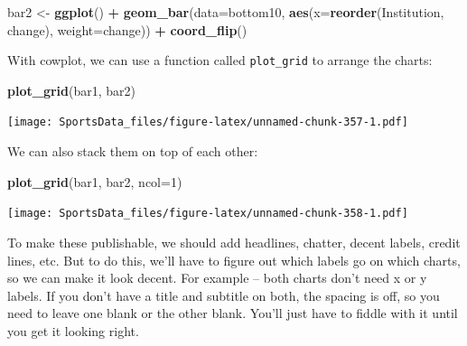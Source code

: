 \documentclass[
]{book}
\newenvironment{Shaded}{\begin{snugshade}}{\end{snugshade}}
\newcommand{\DataTypeTok}[1]{\textcolor[rgb]{0.13,0.29,0.53}{#1}}
\newcommand{\DecValTok}[1]{\textcolor[rgb]{0.00,0.00,0.81}{#1}}
\newcommand{\KeywordTok}[1]{\textcolor[rgb]{0.13,0.29,0.53}{\textbf{#1}}}
\newcommand{\NormalTok}[1]{#1}
\newcommand{\OperatorTok}[1]{\textcolor[rgb]{0.81,0.36,0.00}{\textbf{#1}}}
\newcommand{\StringTok}[1]{\textcolor[rgb]{0.31,0.60,0.02}{#1}}
\begin{document}
\begin{Shaded}
\begin{Highlighting}[]
\NormalTok{bar2 <-}\StringTok{ }\KeywordTok{ggplot}\NormalTok{() }\OperatorTok{+}\StringTok{ }\KeywordTok{geom_bar}\NormalTok{(}\DataTypeTok{data=}\NormalTok{bottom10, }\KeywordTok{aes}\NormalTok{(}\DataTypeTok{x=}\KeywordTok{reorder}\NormalTok{(Institution, change), }\DataTypeTok{weight=}\NormalTok{change)) }\OperatorTok{+}\StringTok{ }\KeywordTok{coord_flip}\NormalTok{()}
\end{Highlighting}
\end{Shaded}

With cowplot, we can use a function called \texttt{plot\_grid} to arrange the charts:

\begin{Shaded}
\begin{Highlighting}[]
\KeywordTok{plot_grid}\NormalTok{(bar1, bar2) }
\end{Highlighting}
\end{Shaded}

\texttt{[image: SportsData\_files/figure-latex/unnamed-chunk-357-1.pdf]}

We can also stack them on top of each other:

\begin{Shaded}
\begin{Highlighting}[]
\KeywordTok{plot_grid}\NormalTok{(bar1, bar2, }\DataTypeTok{ncol=}\DecValTok{1}\NormalTok{) }
\end{Highlighting}
\end{Shaded}

\texttt{[image: SportsData\_files/figure-latex/unnamed-chunk-358-1.pdf]}

To make these publishable, we should add headlines, chatter, decent labels, credit lines, etc. But to do this, we'll have to figure out which labels go on which charts, so we can make it look decent. For example -- both charts don't need x or y labels. If you don't have a title and subtitle on both, the spacing is off, so you need to leave one blank or the other blank. You'll just have to fiddle with it until you get it looking right.
\end{document}
